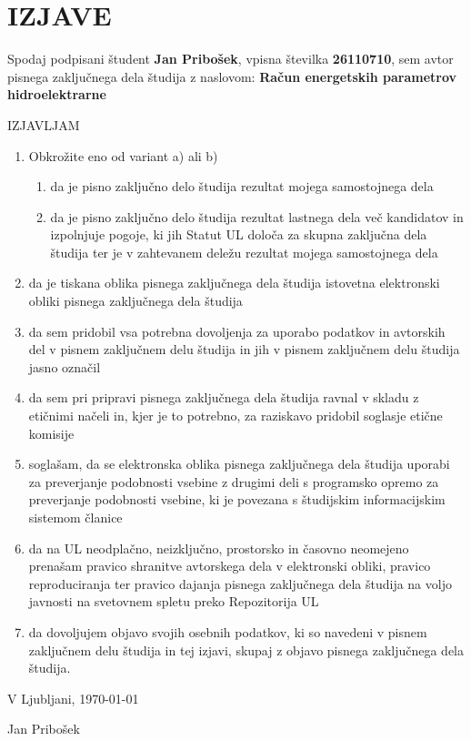 \chapter*{IZJAVE}
\thispagestyle{fancy}

Spodaj podpisani študent \textbf{Jan Pribošek}, vpisna številka \textbf{26110710}, sem avtor pisnega zaključnega dela študija z naslovom: \textbf{Račun energetskih parametrov hidroelektrarne}

\begin{center}
	IZJAVLJAM
\end{center}

\begin{enumerate}
	\item Obkrožite eno od variant a) ali b)
	
		\begin{enumerate}
			\item da je pisno zaključno delo študija rezultat mojega samostojnega dela
			
			\item da je pisno zaključno delo študija rezultat lastnega dela več kandidatov in izpolnjuje pogoje, ki
			jih Statut UL določa za skupna zaključna dela študija ter je v zahtevanem deležu rezultat
			mojega samostojnega dela
		\end{enumerate}
	
	\item da je tiskana oblika pisnega zaključnega dela študija istovetna elektronski obliki pisnega
	zaključnega dela študija
	
	\item da sem pridobil vsa potrebna dovoljenja za uporabo podatkov in avtorskih del v pisnem
	zaključnem delu študija in jih v pisnem zaključnem delu študija jasno označil
	
	\item da sem pri pripravi pisnega zaključnega dela študija ravnal v skladu z etičnimi načeli in, kjer je to
	potrebno, za raziskavo pridobil soglasje etične komisije
	
	\item soglašam, da se elektronska oblika pisnega zaključnega dela študija uporabi za preverjanje
	podobnosti vsebine z drugimi deli s programsko opremo za preverjanje podobnosti vsebine, ki je
	povezana s študijskim informacijskim sistemom članice
	
	\item da na UL neodplačno, neizključno, prostorsko in časovno neomejeno prenašam pravico shranitve
	avtorskega dela v elektronski obliki, pravico reproduciranja ter pravico dajanja pisnega zaključnega
	dela študija na voljo javnosti na svetovnem spletu preko Repozitorija UL
	
	\item da dovoljujem objavo svojih osebnih podatkov, ki so navedeni v pisnem zaključnem delu študija in
	tej izjavi, skupaj z objavo pisnega zaključnega dela študija.
	
\end{enumerate}

\vfill


V Ljubljani, \today 
\vspace{1cm}

\hspace*{\fill}Jan Pribošek